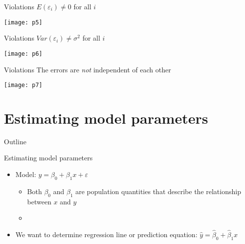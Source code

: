 \documentclass[xcolor=dvipsnames]{beamer}
\begin{document}
\begin{frame}{Violations}
$E(\varepsilon_i) \neq 0$ for all $i$
\begin{center}
	\texttt{[image: p5]}
\end{center}
\end{frame}

\begin{frame}{Violations}
$Var(\varepsilon_i) \neq \sigma^2$ for all $i$
\begin{center}
	\texttt{[image: p6]}
\end{center}
\end{frame}

\begin{frame}{Violations}
The errors are \emph{not} independent of each other
\begin{center}
	\texttt{[image: p7]}
\end{center}
\end{frame}

\section{Estimating model parameters}
\begin{frame}{Outline}
\tableofcontents[currentsection,subsectionstyle=show/shaded/hide]
\end{frame}

\begin{frame}{Estimating model parameters}
	\begin{itemize}
		\item Model: $y = \beta_0 + \beta_1 x + \varepsilon$
		\begin{itemize}
			\item Both $\beta_0$ and $\beta_1$ are population quantities that describe the relationship between $x$ and $y$
			\item[]
		\end{itemize}
		\item We want to determine regression line or prediction equation: $\hat{y} = \hat{\beta}_0 + \hat{\beta}_1 x$
	\end{itemize}
\end{frame}
\end{document}
